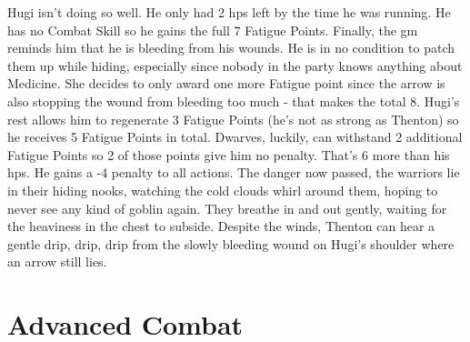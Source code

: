\begin{multicols}{2}
{\begin{exampletext}
	Hugi isn't doing so well. He only had 2 \glspl{hp} left by the time he was running.
	He has no Combat Skill so he gains the full 7 Fatigue Points.
	Finally, the \gls{gm} reminds him that he is bleeding from his wounds.
	He is in no condition to patch them up while hiding, especially since nobody in the party knows anything about Medicine.
	She decides to only award one more Fatigue point since the arrow is also stopping the wound from bleeding too much - that makes the total 8.
	Hugi's rest allows him to regenerate 3 Fatigue Points (he's not as strong as Thenton) so he receives 5 Fatigue Points in total.
	Dwarves, luckily, can withstand 2 additional Fatigue Points so 2 of those points give him no penalty.
	That's 6 more than his \glspl{hp}.
	He gains a -4 penalty to all actions.
	The danger now passed, the warriors lie in their hiding nooks, watching the cold clouds whirl around them, hoping to never see any kind of goblin again.
	They breathe in and out gently, waiting for the heaviness in the chest to subside. Despite the winds, Thenton can hear a gentle drip, drip, drip from the slowly bleeding wound on Hugi's shoulder where an arrow still lies.
	\end{exampletext}
}{}

\end{multicols}

\section{Advanced Combat}
\label{divide_combat}

